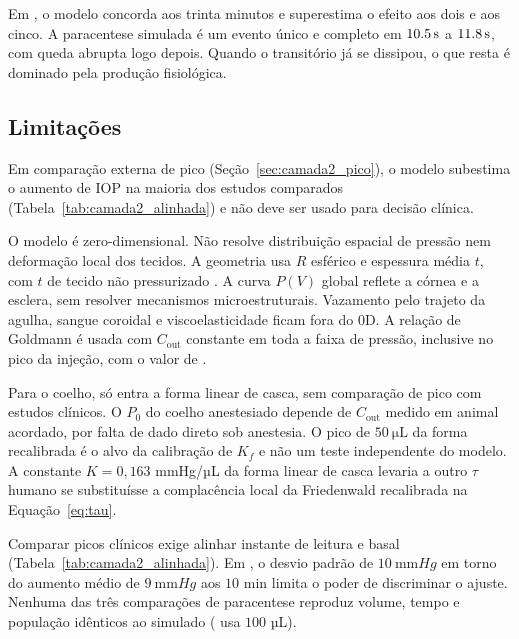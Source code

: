 Em \citet{zaman2025}, o modelo concorda aos trinta minutos e superestima o efeito aos dois e aos cinco. A paracentese simulada é um evento único e completo em $\SI{10{,}5}{\second}$ a $\SI{11{,}8}{\second}$, com queda abrupta logo depois. Quando o transitório já se dissipou, o que resta é dominado pela produção fisiológica.

\subsection{Limitações}
\label{sec:wp0_limitacoes}

Em comparação externa de pico (Seção~\ref{sec:camada2_pico}), o modelo subestima o aumento de IOP na maioria dos estudos comparados (Tabela~\ref{tab:camada2_alinhada}) e não deve ser usado para decisão clínica.

O modelo é zero-dimensional. Não resolve distribuição espacial de pressão nem deformação local dos tecidos. A geometria usa $R$ esférico e espessura média $t$, com $t$ de tecido não pressurizado \citep{vurgese2012}. A curva $P(V)$ global reflete a córnea e a esclera, sem resolver mecanismos microestruturais. Vazamento pelo trajeto da agulha, sangue coroidal e viscoelasticidade ficam fora do 0D. A relação de Goldmann é usada com $C_{\text{out}}$ constante em toda a faixa de pressão, inclusive no pico da injeção, com o valor de \citet{goel2010}.

Para o coelho, só entra a forma linear de casca, sem comparação de pico com estudos clínicos. O $P_0$ do coelho anestesiado depende de $C_{\text{out}}$ medido em animal acordado, por falta de dado direto sob anestesia. O pico de $\SI{50}{\micro\liter}$ da forma recalibrada é o alvo da calibração de $K_f$ e não um teste independente do modelo. A constante $K=0{,}163$ mmHg/µL da forma linear de casca levaria a outro $\tau$ humano se substituísse a complacência local da Friedenwald recalibrada na Equação~\ref{eq:tau}.

Comparar picos clínicos exige alinhar instante de leitura e basal (Tabela~\ref{tab:camada2_alinhada}). Em \citet{lobue2023}, o desvio padrão de $\SI{10}{\milli\meter Hg}$ em torno do aumento médio de $\SI{9}{\milli\meter Hg}$ aos $10$ min limita o poder de discriminar o ajuste. Nenhuma das três comparações de paracentese reproduz volume, tempo e população idênticos ao simulado (\citet{changchung2007} usa $100$ µL).